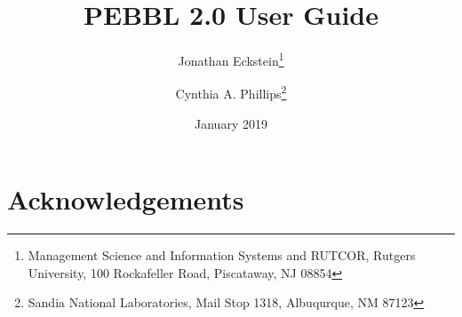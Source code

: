 \documentclass[12pt]{article}
\begin{document}
\title{
PEBBL 2.0 User Guide
}

\author{
Jonathan Eckstein\thanks{
Management Science and Information Systems and RUTCOR, Rutgers University,
100 Rockafeller Road, Piscataway, NJ 08854
}
\and
Cynthia A. Phillips\thanks{
Sandia National Laboratories, Mail Stop 1318, Albuqurque, NM 87123}
}

\date{January 2019}

\maketitle

\begin{abstract}

\end{abstract}

\newpage

\tableofcontents

\newpage



\section*{Acknowledgements}





\end{document}
